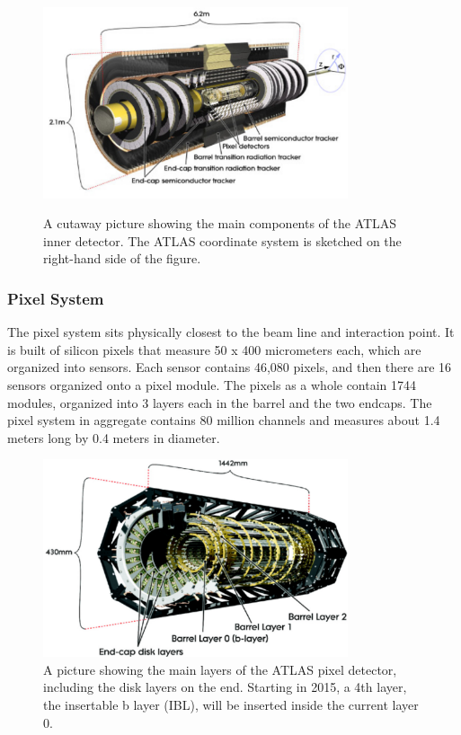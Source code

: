 \begin{figure}
	\includegraphics[width=0.8\textwidth]{ATLASDetector/images/innerDetector.pdf}
	\label{fig:inner_detector}  
	\caption{A cutaway picture showing the main components of the ATLAS inner detector.  The ATLAS coordinate system is sketched on the right-hand side of the figure.}
\end{figure}


\subsubsection{Pixel System}
\label{sec:pixel}
The pixel system sits physically closest to the beam line and interaction point.  It is built of silicon pixels 
that measure 50 x 400 micrometers each, which are organized into sensors.  Each sensor contains 46,080 
pixels, and then there are 16 sensors organized onto a pixel module.  The pixels as a whole contain 1744 
modules, organized into 3 layers each in the barrel and the two endcaps.  
The pixel system in aggregate contains 80 million channels and measures about 1.4 meters long by 0.4 meters in diameter.

\begin{figure}
	\includegraphics[width=0.8\textwidth]{ATLASDetector/images/pixel_detector.pdf} 
	\caption{A picture showing the main layers of the ATLAS pixel detector, including the disk layers on the end.  Starting in 2015, a 4th layer, the insertable b layer (IBL), will be inserted inside the current layer 0. 	\label{fig:inner_detector} }
\end{figure}

